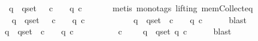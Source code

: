 \begin{isabellebody}
\ \ \ \ {\isasymlongrightarrow}\ {\isacharparenleft}{\isasymexists}\ {\isasymsigma}\ {\isasymin}\ {\isasymSigma}{\isachardot}\ {\isasymforall}\ q{\isacharprime}\ {\isasymin}\ q{\isacharunderscore}set{\isachardot}\ {\isacharparenleft}{\isasymlambda}{\isasymsigma}{\isacharprime}{\isachardot}\ {\isasymforall}\ c\ {\isasymin}\ {\isasymepsilon}\ {\isasymsigma}{\isacharprime}{\isachardot}\ q{\isacharprime}\ c{\isacharparenright}\ {\isasymsigma}{\isacharparenright}{\isachardoublequoteclose}\isanewline
\ \ \ \ \isamarkupfalse%
\ {\isacharparenleft}metis\ {\isacharparenleft}mono{\isacharunderscore}tags{\isacharcomma}\ lifting{\isacharparenright}\ mem{\isacharunderscore}Collect{\isacharunderscore}eq{\isacharparenright}\isanewline
\ \ \isamarkupfalse%
\ \isamarkupfalse%
\isanewline
\ \ \ \ {\isachardoublequoteopen}{\isacharparenleft}{\isasymexists}\ {\isasymsigma}\ {\isasymin}\ {\isasymSigma}{\isachardot}\ {\isasymforall}\ q\ {\isasymin}\ q{\isacharunderscore}set{\isachardot}\ {\isacharparenleft}{\isasymlambda}{\isasymsigma}{\isacharprime}{\isachardot}\ {\isasymforall}\ c\ {\isasymin}\ {\isasymepsilon}\ {\isasymsigma}{\isacharprime}{\isachardot}\ q\ c{\isacharparenright}\ {\isasymsigma}{\isacharparenright}\isanewline
\ \ \ \ {\isasymlongrightarrow}\ {\isacharparenleft}{\isasymexists}\ {\isasymsigma}\ {\isasymin}\ {\isasymSigma}{\isachardot}\ {\isasymforall}\ q{\isacharprime}\ {\isasymin}\ q{\isacharunderscore}set{\isachardot}\ {\isasymforall}\ c\ {\isasymin}\ {\isasymepsilon}\ {\isasymsigma}{\isachardot}\ q{\isacharprime}\ c{\isacharparenright}{\isachardoublequoteclose}\isanewline
\ \ \ \ \isamarkupfalse%
\ blast\isanewline
\ \ \isamarkupfalse%
\ \isamarkupfalse%
\isanewline
\ \ \ \ {\isachardoublequoteopen}{\isacharparenleft}{\isasymexists}\ {\isasymsigma}\ {\isasymin}\ {\isasymSigma}{\isachardot}\ {\isasymforall}\ q\ {\isasymin}\ q{\isacharunderscore}set{\isachardot}\ {\isasymforall}\ c\ {\isasymin}\ {\isasymepsilon}\ {\isasymsigma}{\isachardot}\ q\ c{\isacharparenright}\isanewline
\ \ \ \ {\isasymlongrightarrow}\ {\isacharparenleft}{\isasymexists}\ {\isasymsigma}\ {\isasymin}\ {\isasymSigma}{\isachardot}\ {\isasymforall}\ c\ {\isasymin}\ {\isasymepsilon}\ {\isasymsigma}{\isachardot}\ {\isasymforall}\ q{\isacharprime}\ {\isasymin}\ q{\isacharunderscore}set{\isachardot}\ q{\isacharprime}\ c{\isacharparenright}{\isachardoublequoteclose}\isanewline
\ \ \ \ \isamarkupfalse%
\ blast\isanewline
\ \ \isamarkupfalse%
\ \isamarkupfalse%

\end{isabellebody}
